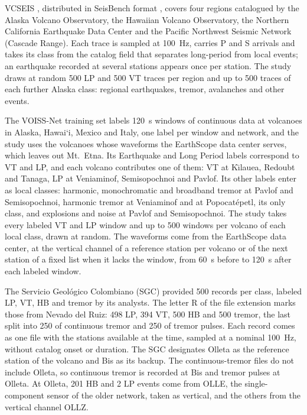 \documentclass[pdflatex,sn-mathphys-num]{sn-jnl}
\begin{document}
VCSEIS \cite{zhong_deep-learning-based_2024}, distributed in SeisBench format
\cite{woollam_seisbenchtoolbox_2022}, covers four regions catalogued by the Alaska
Volcano Observatory, the Hawaiian Volcano Observatory, the Northern
California Earthquake Data Center and the Pacific Northwest Seismic Network
(Cascade Range). Each trace is sampled at 100~Hz, carries P and S arrivals and
takes its class from the catalog field that separates long-period from local
events; an earthquake recorded at several stations appears once per station.
The study draws at random 500 LP and 500 VT traces per region and up to 500
traces of each further Alaska class: regional earthquakes, tremor, avalanches
and other events.

The VOISS-Net training set \cite{fee_generalized_2025} labels 120~s windows
of continuous data at volcanoes in Alaska, Hawai`i, Mexico and Italy, one
label per window and network, and the study uses the volcanoes whose
waveforms the EarthScope data center serves, which leaves out Mt.~Etna. Its Earthquake and Long Period labels correspond to VT
and LP, and each volcano contributes one of them: VT at K\={\i}lauea,
Redoubt and Tanaga, LP at Veniaminof, Semisopochnoi and Pavlof. Its other
labels enter as local classes: harmonic, monochromatic and broadband tremor
at Pavlof and Semisopochnoi, harmonic tremor at Veniaminof and at
Popocat\'epetl, its only class, and explosions and noise at Pavlof and
Semisopochnoi. The study takes every labeled VT and LP window and up to 500
windows per volcano of each local class, drawn at random. The waveforms come
from the EarthScope data center, at the vertical channel of a reference
station per volcano or of the next station of a fixed list when it lacks the
window, from 60~s before to 120~s after each labeled window.

The Servicio Geol\'ogico Colombiano (SGC) provided 500 records per class,
labeled LP, VT, HB and tremor by its analysts. The letter R of the file
extension marks those from Nevado del Ruiz: 498 LP, 394 VT, 500 HB and 500
tremor, the last split into 250 of continuous tremor and 250 of tremor
pulses. Each record comes as one file with the stations available at the
time, sampled at a nominal 100~Hz, without catalog onset or duration. The SGC
designates Olleta as the reference station of the volcano and Bis as its
backup. The continuous-tremor files do not include Olleta, so continuous
tremor is recorded at Bis and tremor pulses at Olleta. At Olleta, 201 HB and
2 LP events come from OLLE, the single-component sensor of the older network,
taken as vertical, and the others from the vertical channel OLLZ.
\end{document}

